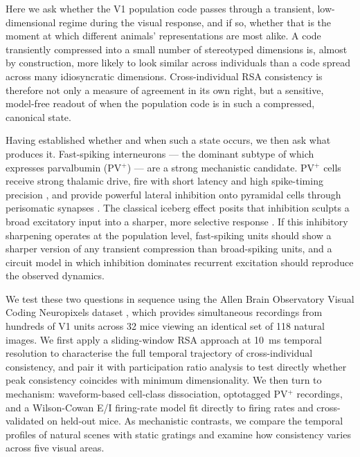 \documentclass[11pt,onecolumn]{article}
\begin{document}
Here we ask whether the V1 population code passes through a transient,
low-dimensional regime during the visual response, and if so, whether
that is the moment at which different animals' representations are most
alike.  A code transiently compressed into a small number of stereotyped
dimensions is, almost by construction, more likely to look similar across
individuals than a code spread across many idiosyncratic dimensions.
Cross-individual RSA consistency is therefore not only a measure of
agreement in its own right, but a sensitive, model-free readout of when
the population code is in such a compressed, canonical state.

Having established whether and when such a state occurs, we then ask
what produces it.  Fast-spiking interneurons --- the dominant subtype
of which expresses parvalbumin (PV$^+$) --- are a strong mechanistic
candidate.  PV$^+$ cells receive strong thalamic drive, fire with short
latency and high spike-timing precision \citep{swadlow2003}, and provide
powerful lateral inhibition onto pyramidal cells through perisomatic
synapses \citep{freund1996}.  The classical iceberg effect posits that
inhibition sculpts a broad excitatory input into a sharper, more
selective response \citep{somers1995,troyer1998}.  If this inhibitory
sharpening operates at the population level, fast-spiking units should
show a sharper version of any transient compression than broad-spiking
units, and a circuit model in which inhibition dominates recurrent
excitation should reproduce the observed dynamics.

We test these two questions in sequence using the Allen Brain Observatory
Visual Coding Neuropixels dataset \citep{siegle2021}, which provides
simultaneous recordings from hundreds of V1 units across 32 mice viewing
an identical set of 118 natural images.  We first apply a sliding-window
RSA approach at 10~ms temporal resolution to characterise the full
temporal trajectory of cross-individual consistency, and pair it with
participation ratio analysis to test directly whether peak consistency
coincides with minimum dimensionality.  We then turn to mechanism:
waveform-based cell-class dissociation, optotagged PV$^+$ recordings,
and a Wilson-Cowan E/I firing-rate model fit directly to firing rates
and cross-validated on held-out mice.  As mechanistic contrasts, we compare
the temporal
profiles of natural scenes with static gratings and examine how
consistency varies across five visual areas.

\end{document}
